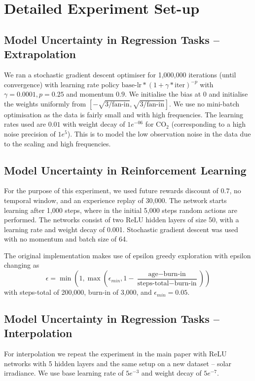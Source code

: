 \documentclass{article} %
\theoremstyle{definition}
\begin{document}
\section{Detailed Experiment Set-up}

\subsection{Model Uncertainty in Regression Tasks -- Extrapolation}

We ran a stochastic gradient descent optimiser for 1,000,000 iterations (until convergence) with learning rate policy $\text{base-lr} * (1 + \gamma * \text{iter})^{-p}$ with $\gamma=0.0001, p=0.25$ and momentum $0.9$. We initialise the bias at 0 and initialise the weights uniformly from $[-\sqrt{3 / \text{fan-in}},\sqrt{3 / \text{fan-in}}]$. We use no mini-batch optimisation as the data is fairly small and with high frequencies. The learning rates used are $0.01$ with weight decay of $1e^{-06}$ for CO$_2$ (corresponding to a high noise precision of $1e^{5}$). This is to model the low observation noise in the data due to the scaling and high frequencies.

\subsection{Model Uncertainty in Reinforcement Learning}

For the purpose of this experiment, we used future rewards discount of $0.7$, no temporal window, and an experience replay of 30,000. The network starts learning after 1,000 steps, where in the initial 5,000 steps random actions are performed.
The networks consist of two ReLU hidden layers of size 50, with a learning rate and weight decay of 0.001. Stochastic gradient descent was used with no momentum and batch size of 64.

The original implementation makes use of epsilon greedy exploration with epsilon changing as 
$$
\epsilon = \min \left(1, \max \left(\epsilon_{min}, 1 - \frac{\text{age} - \text{burn-in}}{\text{steps-total} - \text{burn-in}} \right) \right)
$$
with steps-total of 200,000, burn-in of 3,000, and $\epsilon_{min}=0.05$. 

\subsection{Model Uncertainty in Regression Tasks -- Interpolation}

For interpolation we repeat the experiment in the main paper with ReLU networks with 5 hidden layers and the same setup on a new dataset -- solar irradiance. We use base learning rate of $5e^{-3}$ and weight decay of $5e^{-7}$. 
\end{document}
